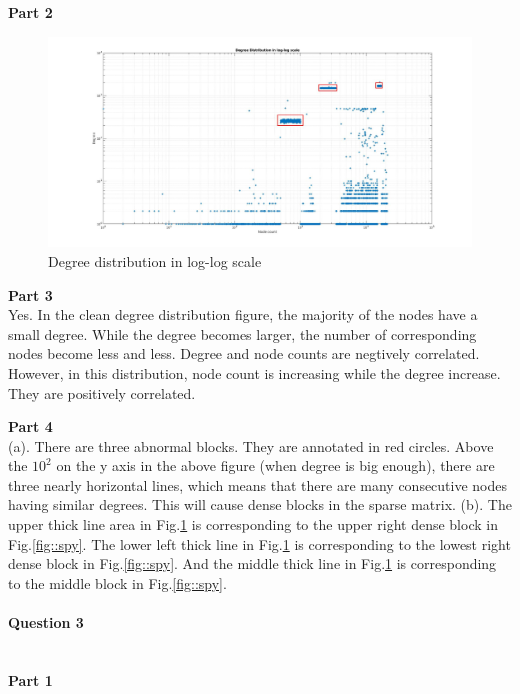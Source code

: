 \documentclass[11pt]{article}
\begin{document}
\noindent
\textbf{Part 2} \\
\begin{figure}[!h]
    \centering
    \includegraphics[width=\linewidth]{figs/q2.jpg}
    \caption{Degree distribution in log-log scale}
    \label{fig::deg_log}
\end{figure}

\noindent
\textbf{Part 3} \\
Yes. In the clean degree distribution figure, the majority of the nodes have a small degree. While the degree becomes larger, the number of corresponding nodes become less and less. Degree and node counts are negtively correlated. However, in this distribution, node count is increasing while the degree increase. They are positively correlated.

\noindent
\textbf{Part 4} \\
(a). There are three abnormal blocks. They are annotated in red circles. Above the $10^2$ on the y axis in the above figure (when degree is big enough), there are three nearly horizontal lines, which means that there are many consecutive nodes having similar degrees. This will cause dense blocks in the sparse matrix.
\noindent
(b). The upper thick line area in Fig.\ref{fig::deg_log} is corresponding to the upper right dense block in Fig.\ref{fig::spy}. The lower left thick line in Fig.\ref{fig::deg_log} is corresponding to the lowest right dense block in Fig.\ref{fig::spy}. And the middle thick line in Fig.\ref{fig::deg_log} is corresponding to the middle block in Fig.\ref{fig::spy}.

\paragraph{Question 3}\mbox{} \\
\noindent
\textbf{Part 1} \\
\end{document}
